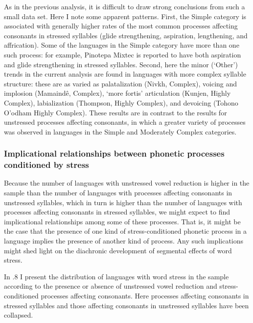   As in the previous analysis, it is difficult to draw strong conclusions from such a small data set. Here I note some apparent patterns. First, the Simple category is associated with generally higher rates of the most common processes affecting consonants in stressed syllables (glide strengthening, aspiration, lengthening, and affrication). Some of the languages in the Simple category have more than one such process: for example, Pinotepa Mixtec is reported to have both aspiration and glide strengthening in stressed syllables. Second, here the minor (‘Other’) trends in the current analysis are found in languages with more complex syllable structure: these are as varied as palatalization (Nivkh, Complex), voicing and implosion (Mamaindê, Complex), ‘more fortis’ articulation (Kunjen, Highly Complex), labialization (Thompson, Highly Complex), and devoicing (Tohono O’odham Highly Complex). These results are in contrast to the results for unstressed processes affecting consonants, in which a greater variety of processes was observed in languages in the Simple and Moderately Complex categories.

\subsubsection{{Implicational} {relationships} {between} {phonetic} {processes} {conditioned} {by} {stress}}\label{sec:5.4.3.4}

  Because the number of languages with unstressed vowel reduction is higher in the sample than the number of languages with processes affecting consonants in unstressed syllables, which in turn is higher than the number of languages with processes affecting consonants in stressed syllables, we might expect to find implicational relationships among some of these processes. That is, it might be the case that the presence of one kind of stress-conditioned phonetic process in a language implies the presence of another kind of process. Any such implications might shed light on the diachronic development of segmental effects of word stress.

  In .8 I present the distribution of languages with word stress in the sample according to the presence or absence of unstressed vowel reduction and stress-conditioned processes affecting consonants. Here processes affecting consonants in stressed syllables and those affecting consonants in unstressed syllables have been collapsed.

